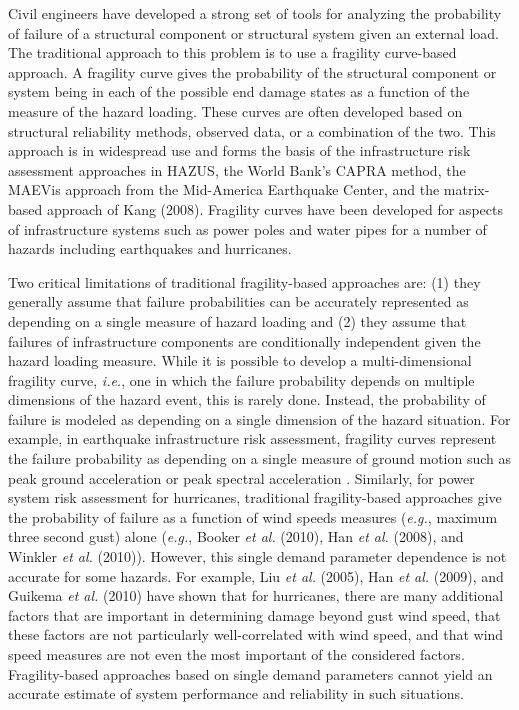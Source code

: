 Civil engineers have developed a strong set of tools for analyzing the probability of failure of a structural component or structural system given an external load. The traditional approach to this problem is to use a fragility curve-based approach. A fragility curve gives the probability of the structural component or system being in each of the possible end damage states as a function of the measure of the hazard loading. These curves are often developed based on structural reliability methods, observed data, or a combination of the two. This approach is in widespread use and forms the basis of the infrastructure risk assessment approaches in HAZUS, the World Bank's CAPRA method, the MAEVis approach from the Mid-America Earthquake Center, and the matrix-based approach of Kang (2008)\cite{Kang2008}. Fragility curves have been developed for aspects of infrastructure systems such as power poles and water pipes for a number of hazards including earthquakes and hurricanes.

Two critical limitations of traditional fragility-based approaches are: (1) they generally assume that failure probabilities can be accurately represented as depending on a single measure of hazard loading and (2) they assume that failures of infrastructure components are conditionally independent given the hazard loading measure. While it is possible to develop a multi-dimensional fragility curve, \emph{i.e.}, one in which the failure probability depends on multiple dimensions of the hazard event, this is rarely done. Instead, the probability of failure is modeled as depending on a single dimension of the hazard situation. For example, in earthquake infrastructure risk assessment, fragility curves represent the failure probability as depending on a single measure of ground motion such as peak ground acceleration or peak spectral acceleration \cite{Cagnan2005}. Similarly, for power system risk assessment for hurricanes, traditional fragility-based approaches give the probability of failure as a function of wind speeds measures (\emph{e.g.}, maximum three second gust) alone (\emph{e.g.}, Booker \emph{et al.} (2010)\cite{Booker2010}, Han \emph{et al.} (2008)\cite{Han2008}, and Winkler \emph{et al.} (2010)\cite{Winkler2010}). However, this single demand parameter dependence is not accurate for some hazards. For example, Liu \emph{et al.} (2005)\cite{Liu2005}, Han \emph{et al.} (2009)\cite{Han2009b}, and Guikema \emph{et al.} (2010)\cite{Guikema2010} have shown that for hurricanes, there are many additional factors that are important in determining damage beyond gust wind speed, that these factors are not particularly well-correlated with wind speed, and that wind speed measures are not even the most important of the considered factors. Fragility-based approaches based on single demand parameters cannot yield an accurate estimate of system performance and reliability in such situations. 

